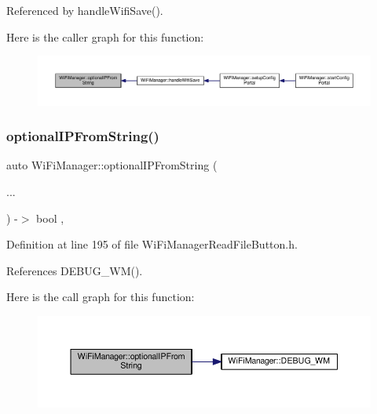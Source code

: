 Referenced by handle\+Wifi\+Save().

Here is the caller graph for this function\+:
\nopagebreak
\begin{figure}[H]
\begin{center}
\leavevmode
\includegraphics[width=350pt]{d4/dc8/class_wi_fi_manager_a6a94f08eb43e0871932556a4ccfa11b7_icgraph}
\end{center}
\end{figure}
\mbox{\label{class_wi_fi_manager_aa248b818eee0423b14a88c637f7c4637}} 
\subsubsection{\texorpdfstring{optional\+I\+P\+From\+String()}{optionalIPFromString()}\hspace{0.1cm}{\footnotesize\ttfamily [2/2]}}
{\footnotesize\ttfamily auto Wi\+Fi\+Manager\+::optional\+I\+P\+From\+String (\begin{DoxyParamCaption}\item[{}]{... }\end{DoxyParamCaption}) -\/$>$ bool \hspace{0.3cm}{\ttfamily [inline]}, {\ttfamily [private]}}



Definition at line 195 of file Wi\+Fi\+Manager\+Read\+File\+Button.\+h.



References D\+E\+B\+U\+G\+\_\+\+W\+M().

Here is the call graph for this function\+:
\nopagebreak
\begin{figure}[H]
\begin{center}
\leavevmode
\includegraphics[width=350pt]{d4/dc8/class_wi_fi_manager_aa248b818eee0423b14a88c637f7c4637_cgraph}
\end{center}
\end{figure}


